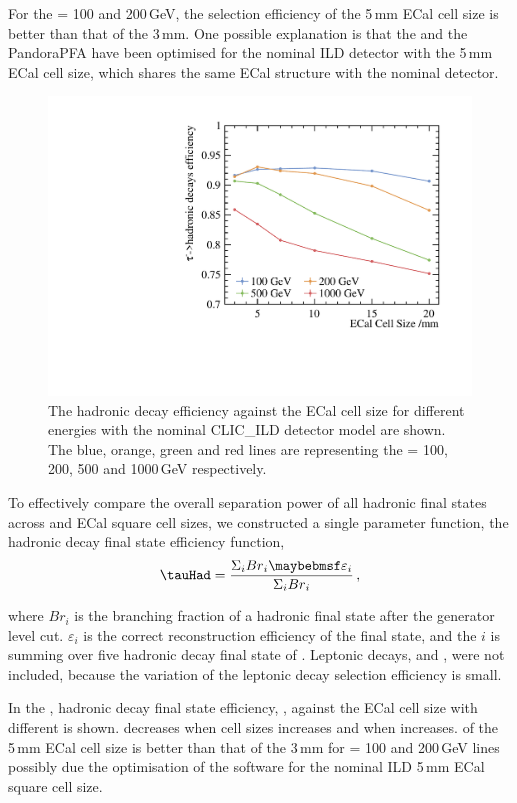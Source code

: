 For the \rootS = 100 and 200\,GeV, the selection efficiency of the 5\,mm ECal cell size is better than that of the 3\,mm. One possible explanation is that the  and the PandoraPFA have been optimised for the nominal ILD detector with the 5\,mm ECal cell size, which shares the same ECal structure with the nominal \CLICILD detector.


\begin{figure}[htbp]
\centering %
\includegraphics[width=.45\textwidth]{tau/hadronicEff}
\caption[]%
{The \Pgt hadronic decay efficiency against the ECal cell size for different \rootS energies with the nominal CLIC\_ILD detector model are shown. The blue, orange, green and red lines are representing the \sqrtS = 100, 200, 500 and 1000\,GeV respectively.}
\label{fig:TauHadronicEfficiency}
\end{figure}


To effectively compare the overall separation power of all hadronic final states across \sqrtS and ECal square cell sizes, we constructed a single parameter function, the  \Pgt hadronic decay final state efficiency function,
\begin{equation}
\label{eq:had}
\tauHad = \frac{\Sigma_{i} {Br}_{i}\varepsilon_{i}}{\Sigma_{i} {Br}_{i}}  \,,
\end{equation}

where $Br_{i}$ is the branching fraction of a hadronic final state after the generator level cut. $\varepsilon_{i}$ is the correct reconstruction efficiency of the final state, and the $i$ is summing over five hadronic decay final state of \Pgt. Leptonic decays, \decayElectron and \decayMuon, were not included, because the variation of the leptonic decay selection efficiency is small.


In the , \Pgt hadronic decay final state efficiency, \tauHad, against the ECal cell size with different \sqrtS is shown. \tauHad decreases when cell sizes increases and when \sqrtS increases.  \tauHad of the 5\,mm ECal cell size is better than that of the 3\,mm for \sqrtS = 100 and 200\,GeV lines possibly due the optimisation of the software for the nominal ILD 5\,mm ECal square cell size.

